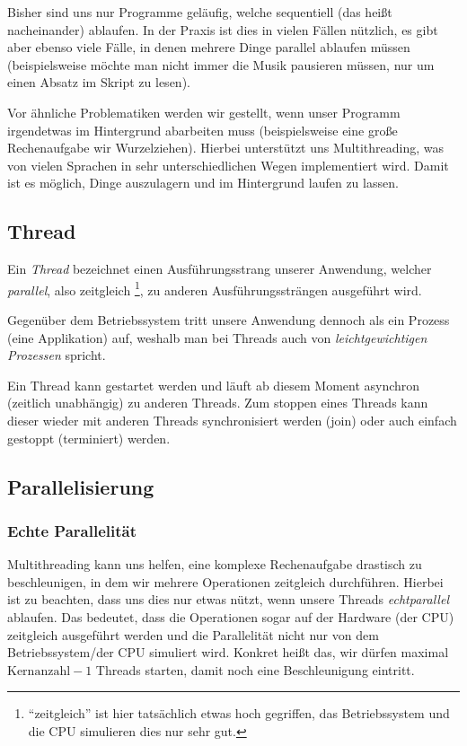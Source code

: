 
Bisher sind uns nur Programme geläufig, welche sequentiell (das heißt nacheinander) ablaufen. In der Praxis ist dies in vielen Fällen nützlich, es gibt aber ebenso viele Fälle, in denen mehrere Dinge parallel ablaufen müssen (beispielsweise möchte man nicht immer die Musik pausieren müssen, nur um einen Absatz im Skript zu lesen).

Vor ähnliche Problematiken werden wir gestellt, wenn unser Programm irgendetwas im Hintergrund abarbeiten muss (beispielsweise eine große Rechenaufgabe wir Wurzelziehen). Hierbei unterstützt uns Multithreading, was von vielen Sprachen in sehr unterschiedlichen Wegen implementiert wird. Damit ist es möglich, Dinge auszulagern und im Hintergrund laufen zu lassen.

\subsection{Thread}
	Ein \textit{Thread} bezeichnet einen Ausführungsstrang unserer Anwendung, welcher \textit{parallel}, also zeitgleich \footnote{\enquote{zeitgleich} ist hier tatsächlich etwas hoch gegriffen, das Betriebssystem und die CPU simulieren dies nur sehr gut.}, zu anderen Ausführungssträngen ausgeführt wird.
	
	Gegenüber dem Betriebssystem tritt unsere Anwendung dennoch als ein Prozess (eine Applikation) auf, weshalb man bei Threads auch von \textit{leichtgewichtigen Prozessen} spricht.
	
	Ein Thread kann gestartet werden und läuft ab diesem Moment asynchron (zeitlich unabhängig) zu anderen Threads. Zum stoppen eines Threads kann dieser wieder mit anderen Threads synchronisiert werden (join) oder auch einfach gestoppt (terminiert) werden.

\subsection{Parallelisierung}
	\subsubsection{Echte Parallelität}
		Multithreading kann uns helfen, eine komplexe Rechenaufgabe drastisch zu beschleunigen, in dem wir mehrere Operationen zeitgleich durchführen. Hierbei ist zu beachten, dass uns dies nur etwas nützt, wenn unsere Threads \textit{echtparallel} ablaufen. Das bedeutet, dass die Operationen sogar auf der Hardware (der CPU) zeitgleich ausgeführt werden und die Parallelität nicht nur von dem Betriebssystem/der CPU simuliert wird. Konkret heißt das, wir dürfen maximal \( \text{Kernanzahl} - 1 \) Threads starten, damit noch eine Beschleunigung eintritt.
	
